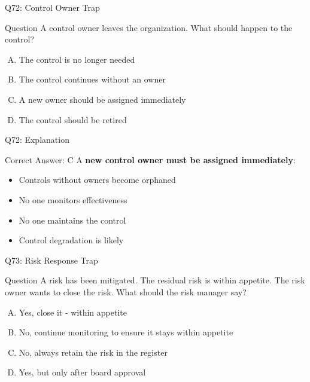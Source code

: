 \documentclass{beamer}
\begin{document}
	\begin{frame}{Q72: Control Owner Trap}
		\begin{block}{Question}
			A control owner leaves the organization. What should happen to the control?
		\end{block}
		\begin{enumerate}[(A)]
			\item The control is no longer needed
			\item The control continues without an owner
			\item A new owner should be assigned immediately
			\item The control should be retired
		\end{enumerate}
	\end{frame}
	
	\begin{frame}{Q72: Explanation}
		\begin{block}{Correct Answer: C}
			A \textbf{new control owner must be assigned immediately}:
			\begin{itemize}
				\item Controls without owners become orphaned
				\item No one monitors effectiveness
				\item No one maintains the control
				\item Control degradation is likely
			\end{itemize}
		\end{block}
	\end{frame}
	
	\begin{frame}{Q73: Risk Response Trap}
		\begin{block}{Question}
			A risk has been mitigated. The residual risk is within appetite. The risk owner wants to close the risk. What should the risk manager say?
		\end{block}
		\begin{enumerate}[(A)]
			\item Yes, close it - within appetite
			\item No, continue monitoring to ensure it stays within appetite
			\item No, always retain the risk in the register
			\item Yes, but only after board approval
		\end{enumerate}
	\end{frame}
	
\end{document}
